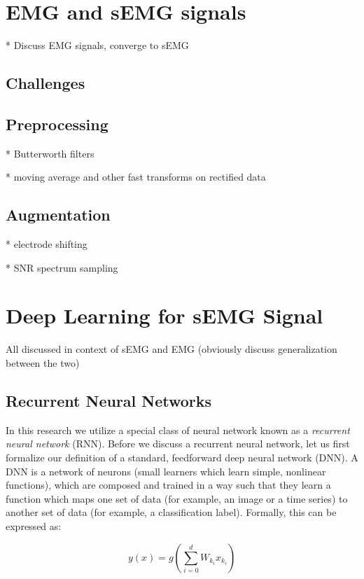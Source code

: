 \documentclass{llncs}
\begin{document}
\section{EMG and sEMG signals}

* Discuss EMG signals, converge to sEMG

\subsection{Challenges}

\subsection{Preprocessing}

* Butterworth filters

* moving average and other fast transforms on rectified data


\subsection{Augmentation}

* electrode shifting

* SNR spectrum sampling


\section{Deep Learning for sEMG Signal}

All discussed in context of sEMG and EMG (obviously discuss generalization between the two)
 \subsection{Recurrent Neural Networks}
 In this research we utilize a special class of neural network known as a \textit{recurrent neural network} (RNN). Before we discuss a recurrent neural network, let us first formalize our definition of a standard, feedforward deep neural network (DNN). A DNN is a network of neurons (small learners which learn simple, nonlinear functions), which are composed and trained in a way such that they learn a function which maps one set of data (for example, an image or a time series) to another set of data (for example, a classification label). Formally, this can be expressed as:

 \begin{equation}
 y(x) = g \left(\sum_{i=0}^d W_{k_i} x_{k_i}\right)
 \end{equation}
\end{document}
